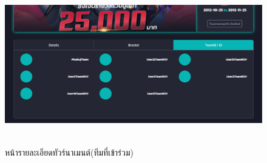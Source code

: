     \begin{figure}[ht]
      \begin{center}
      \includegraphics[width=18cm,height=7cm,keepaspectratio]{tournament_each_tj.png}
      \end{center}
      \caption[หน้ารายละเอียดทัวร์นาเมนต์(ทีมที่เข้าร่วม)]{หน้ารายละเอียดทัวร์นาเมนต์(ทีมที่เข้าร่วม)}
      \label{fig:หน้ารายละเอียดทัวร์นาเมนต์(ทีมที่เข้าร่วม)}
    \end{figure}
 
